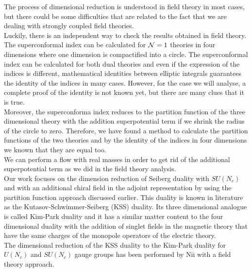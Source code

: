 The process of dimensional reduction is understood in field theory in most cases, but there could be some difficulties that are related to the fact that we are dealing with strongly coupled field theories.\\
Luckily, there is an independent way to check the results obtained in  field theory.\\
The superconformal index can be calculated for $\mathcal{N}=1$ theories in four dimensions where one dimension is compactified into a circle. 
The superconformal index can be calculated for both dual theories and even if the expression of the indices is different, mathematical identities between elliptic integrals guarantees the identity of the indices in many cases.  
However, for the case we will analyse, a complete proof of the identity is not  known yet, but there are many clues that it is true.\\
Moreover, the superconforma index reduces to the partition function of the three dimensional theory with the addition superpotential term if we shrink the radius of the circle to zero.  
Therefore, we have found a method to calculate the partition functions of the two theories and by the identity of the indices in four dimensions we known that they are equal too.\\
We can perform a flow with real masses in order to get rid of the additional superpotential term as we did in the field theory analysis.\\

Our work focuses on the dimension reduction of Seiberg duality with $SU(N_c)$ and with an additional chiral field in the adjoint representation by using the partition function approach discussed earlier.
This duality is known in literature as the Kutasov-Schwimmer-Seiberg (KSS) duality.
Its three dimensional analogue is called Kim-Park duality and it has a similar matter content to the four dimensional duality with the addition of singlet fields in the magnetic theory that have the same charges of the monopole operators of the electric theory. \\
The dimensional reduction of the KSS duality to the Kim-Park duality for $U(N_c)$ and $SU(N_c)$ gauge groups has been performed by Nii with a field theory approach.





